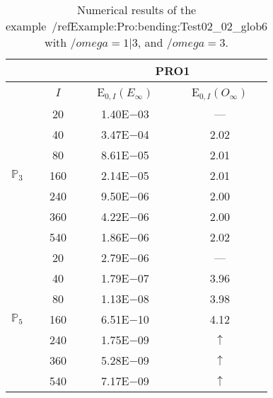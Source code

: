 \begin{table}[H]
\caption{Numerical results of the example~/ref{Example:Pro:bending:Test02_02_glob6} with $/omega=1|3$, and $/omega=3$.}
\setlength{\tabcolsep}{5pt}
\centering
\begin{tabular}{@{}l c c c@{}}
\toprule
 &  & \multicolumn{2}{c}{PRO1}\\
\midrule
 & $I$ & E$_{0,I}(E_{\infty})$ & E$_{0,I}(O_{\infty})$\\
\midrule
\multirow{7}{*}{$\mathbb{P}_{3}$}
 & 20 & 1.40E$-$03 & ---\\
 & 40 & 3.47E$-$04 & 2.02\\
 & 80 & 8.61E$-$05 & 2.01\\
 & 160 & 2.14E$-$05 & 2.01\\
 & 240 & 9.50E$-$06 & 2.00\\
 & 360 & 4.22E$-$06 & 2.00\\
 & 540 & 1.86E$-$06 & 2.02\\
\midrule
\multirow{7}{*}{$\mathbb{P}_{5}$}
 & 20 & 2.79E$-$06 & ---\\
 & 40 & 1.79E$-$07 & 3.96\\
 & 80 & 1.13E$-$08 & 3.98\\
 & 160 & 6.51E$-$10 & 4.12\\
 & 240 & 1.75E$-$09 & $\uparrow$\\
 & 360 & 5.28E$-$09 & $\uparrow$\\
 & 540 & 7.17E$-$09 & $\uparrow$\\
\bottomrule
\end{tabular}
\label{Table:PRO:test_02_02_test23_pro1}
\end{table}
